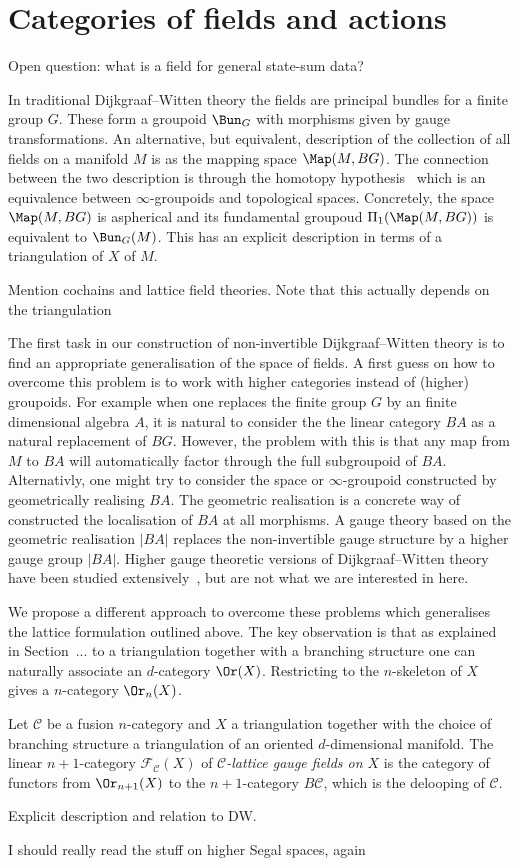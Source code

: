 
\section{Categories of fields and actions} 

Open question: what is a field for general state-sum data?

In traditional Dijkgraaf--Witten theory the fields are principal bundles for a finite
group $G$. These form a groupoid $\Bun_G$ with morphisms given by gauge 
transformations. An alternative, but equivalent, description of the collection of all fields on a manifold $M$ is as the mapping space $\Map(M,BG)$. The connection
between the two description is through the homotopy hypothesis~\cite{} which is
an equivalence between $\infty$-groupoids and topological spaces. Concretely,
the space $\Map(M,BG)$ is aspherical and its fundamental groupoud $\Pi_1 
(\Map(M,BG))$ is equivalent to $\Bun_G(M)$.
This has an explicit description in terms of a triangulation of $X$ of $M$. 

\color{red} Mention cochains and lattice field theories. Note that this actually 
depends on the triangulation \color{black}

The first task in our construction of non-invertible Dijkgraaf--Witten theory
is to find an appropriate generalisation of the space of fields. A first guess
on how to overcome this problem is to work with higher categories instead of
(higher) groupoids. For example when one replaces the finite group $G$ by an 
finite dimensional algebra $A$, it is natural to consider the the linear category
$BA$ as a natural replacement of $BG$. However, the problem with this is 
that any map from $M$ to $BA$ will automatically factor through the full 
subgroupoid of $BA$. Alternativly, one might try to consider the space or 
$\infty$-groupoid constructed by geometrically realising $BA$. The geometric 
realisation is a concrete way of constructed the localisation of $BA$ at all 
morphisms. A gauge theory based on the geometric realisation $|BA|$ replaces the 
non-invertible gauge structure by a higher gauge group $|BA|$. Higher gauge 
theoretic versions of Dijkgraaf--Witten theory have been studied 
extensively~\cite{some thing}, but are not what we are interested in here. 

We propose a different approach to overcome these problems which generalises the
lattice formulation outlined above. The key observation is that as explained in 
Section~... to a triangulation together with a branching structure one can naturally associate an $d$-category $\Or(X)$. Restricting to the $n$-skeleton  
of $X$ gives a $n$-category $\Or_n(X)$. 
\begin{definition}
Let $\mathcal{C}$ be a fusion $n$-category and $X$ a triangulation together with 
the choice of branching structure a triangulation of an oriented $d$-dimensional manifold.
The linear $n+1$-category $\mathcal{F}_\mathcal{C}(X)$ of 
\emph{$\mathcal{C}$-lattice gauge fields on $X$} is the category of functors from $\Or_{n+1}(X)$ to the $n+1$-category $B\mathcal{C}$, which is the delooping of $\mathcal{C}$. 
\end{definition}

\color{red} 
Explicit description and relation to DW.

I should really read the stuff on higher Segal spaces, again \color{black}
